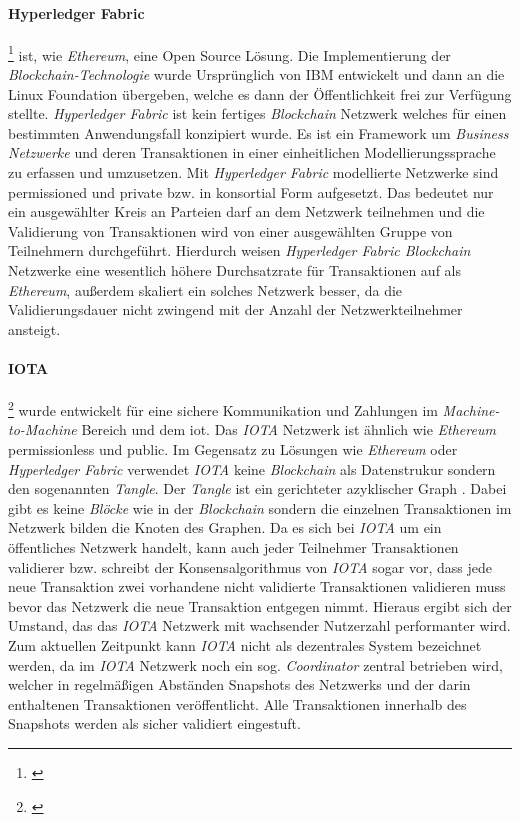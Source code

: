 \paragraph{Hyperledger Fabric}\footnote{\citet{Valenta2017}}
ist, wie \textit{Ethereum}, eine Open Source Lö\-sung. Die Implementierung der \textit{Blockchain-Technologie} wurde Ursprünglich von IBM entwickelt und dann an die Linux Foundation übergeben, welche es dann der Öffentlichkeit frei zur Verfügung stellte. \textit{Hyperledger Fabric} ist kein fertiges \textit{Blockchain} Netzwerk welches für einen bestimmten Anwendungsfall konzipiert wurde. Es ist ein Framework um \textit{Business Netzwerke} und deren Transaktionen in einer einheitlichen Modellierungssprache zu erfassen und umzusetzen. Mit \textit{Hyperledger Fabric} modellierte Netzwerke sind permissioned und private bzw. in konsortial Form aufgesetzt. Das bedeutet nur ein ausgewählter Kreis an Parteien darf an dem Netzwerk teilnehmen und die Validierung von Transaktionen wird von einer ausgewählten Gruppe von Teilnehmern durchgeführt. Hierdurch weisen \textit{Hyperledger Fabric Blockchain} Netzwerke eine wesentlich höhere Durchsatzrate für Transaktionen auf als \textit{Ethereum}, außerdem skaliert ein solches Netzwerk besser, da die Validierungsdauer nicht zwingend mit der Anzahl der Netzwerkteilnehmer ansteigt.

\paragraph{IOTA}\footnote{\citet{Popov2018}}
wurde entwickelt für eine sichere Kommunikation und Zahlungen im \textit{Machine-to-Machine} Bereich und dem \ac{iot}. Das \textit{IOTA} Netzwerk ist ähnlich wie \textit{Ethereum} permissionless und public. Im Gegensatz zu Lösungen wie \textit{Ethereum} oder \textit{Hyperledger Fabric} verwendet \textit{IOTA} keine \textit{Blockchain} als Datenstrukur sondern den sogenannten \textit{Tangle}. Der \textit{Tangle} ist ein gerichteter azyklischer Graph \citep{Ferraro2018}. Dabei gibt es keine \textit{Blöcke} wie in der \textit{Blockchain} sondern die einzelnen Transaktionen im Netzwerk bilden die Knoten des Graphen. Da es sich bei \textit{IOTA} um ein öffentliches Netzwerk handelt, kann auch jeder Teilnehmer Transaktionen validierer bzw. schreibt der Konsensalgorithmus von \textit{IOTA} sogar vor, dass jede neue Transaktion zwei vorhandene nicht validierte Transaktionen validieren muss bevor das Netzwerk die neue Transaktion entgegen nimmt. Hieraus ergibt sich der Umstand, das das \textit{IOTA} Netzwerk mit wachsender Nutzerzahl performanter wird. Zum aktuellen Zeitpunkt kann \textit{IOTA} nicht als dezentrales System bezeichnet werden, da im \textit{IOTA} Netzwerk noch ein sog. \textit{Coordinator} zentral betrieben wird, welcher in regelmäßigen Abständen Snapshots des Netzwerks und der darin enthaltenen Transaktionen veröffentlicht. Alle Transaktionen innerhalb des Snapshots werden als sicher validiert eingestuft.

